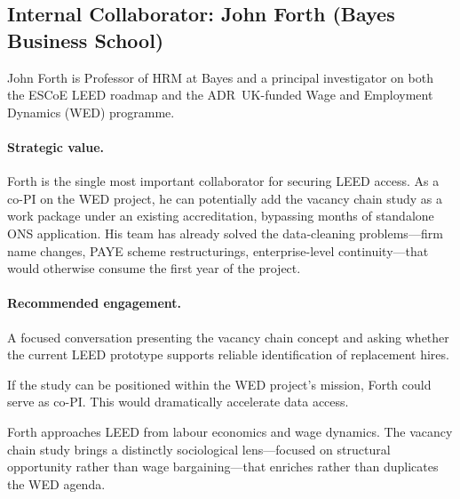 \documentclass[a4paper]{tufte-handout}
\begin{document}
\subsection{Internal Collaborator: John Forth (Bayes Business School)}


John Forth is Professor of HRM at Bayes and a principal investigator on both the ESCoE LEED roadmap and the ADR~UK-funded Wage and Employment Dynamics (WED) programme.

\paragraph{Strategic value.}
Forth is the single most important collaborator for securing LEED access. As a co-PI on the WED project, he can potentially add the vacancy chain study as a work package under an existing accreditation, bypassing months of standalone ONS application. His team has already solved the data-cleaning problems---firm name changes, PAYE scheme restructurings, enterprise-level continuity---that would otherwise consume the first year of the project.

\paragraph{Recommended engagement.}

\begin{description}[style=nextline, font=\normalfont\itshape]
  \item[Initial meeting]
    A focused conversation presenting the vacancy chain concept and asking whether the current LEED prototype supports reliable identification of replacement hires.
  \item[Co-investigator status]
    If the study can be positioned within the WED project's mission, Forth could serve as co-PI\@. This would dramatically accelerate data access.
  \item[Complementary expertise]
    Forth approaches LEED from labour economics and wage dynamics. The vacancy chain study brings a distinctly sociological lens---focused on structural opportunity rather than wage bargaining---that enriches rather than duplicates the WED agenda.
\end{description}
\end{document}
